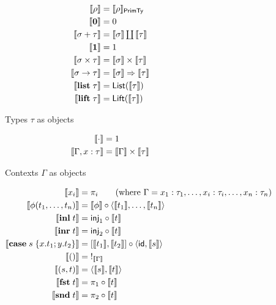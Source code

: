 \begin{figure}
\begin{subfigure}[t]{0.47\linewidth}
  \begin{align*}
  \small
  \llbracket \rho \rrbracket &= \llbracket \rho \rrbracket_{\mathsf{PrimTy}}
  \\
  \llbracket \mathbf{0} \rrbracket &= 0
  \\
  \llbracket \sigma + \tau \rrbracket &= \textstyle {\llbracket \sigma \rrbracket} \coprod {\llbracket \tau \rrbracket}
  \\
  \llbracket \mathbf{1} \rrbracket &= 1
  \\
  \llbracket \sigma \times \tau \rrbracket &= \llbracket \sigma \rrbracket \times \llbracket \tau \rrbracket
  \\
  \llbracket \sigma \to \tau \rrbracket &= \llbracket \sigma \rrbracket \Rightarrow \llbracket \tau \rrbracket
  \\
  \llbracket \mathbf{list}\;\tau \rrbracket &= \mathsf{List}(\llbracket \tau \rrbracket)
  \\
  \llbracket \mathbf{lift}\;\tau \rrbracket &= \mathsf{Lift}(\llbracket \tau \rrbracket)
  \end{align*}
  \caption{Types $\tau$ as objects}
  \label{fig:semantics:types}
\end{subfigure}%
\begin{subfigure}[t]{0.47\linewidth}
  \begin{align*}
  \small
  \llbracket \cdot \rrbracket &= 1
  \\
  \llbracket \Gamma, x: \tau \rrbracket &= \llbracket \Gamma \rrbracket \times \llbracket \tau \rrbracket
  \end{align*}
  \caption{Contexts $\Gamma$ as objects}
  \label{fig:semantics:contexts}
\end{subfigure}
\begin{subfigure}{\linewidth}
  \begin{align*}
  \small
  \sem{x_i} &= \pi_i
  \tag*{\text{(where $\Gamma = x_1: \tau_1, \ldots, x_i: \tau_i, \ldots, x_n: \tau_n$)}}
  \\
  \sem{\phi(t_1, \ldots, t_n)}
  &=
  \sem{\phi} \comp \prodM{\sem{t_1}}{\ldots, \sem{t_n}}
  \\
  \sem{\tmInl{t}} &= \mathsf{inj}_1 \comp \sem{t}
  \\
  \sem{\tmInr{t}} &= \mathsf{inj}_2 \comp \sem{t}
  \\
  \sem{\tmCase{s}{x}{t_1}{y}{t_2}} &= \coprodM{\sem{t_1}}{\sem{t_2}} \comp \prodM{\id}{\sem{s}}
  \\
  \sem{\tmUnit} &=\;!_{\sem{\Gamma}}
  \\
  \sem{\tmPair{s}{t}} &= \prodM{\sem{s}}{\sem{t}}
  \\
  \sem{\tmFst{t}} &= \pi_1 \comp \sem{t}
  \\
  \sem{\tmSnd{t}} &= \pi_2 \comp \sem{t}

\end{align*}
\end{subfigure}
\end{figure}
